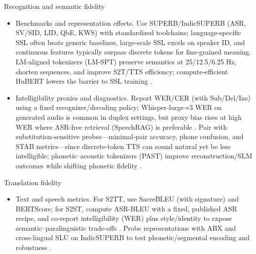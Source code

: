 Recognition and semantic fidelity
\begin{itemize}
  \item Benchmarks and representation effects. Use SUPERB/IndicSUPERB (ASR, SV/SID, LID, QbE, KWS) with standardized toolchains; language-specific SSL often beats generic baselines, large-scale SSL excels on speaker ID, and continuous features typically surpass discrete tokens for fine-grained meaning. LM-aligned tokenizers (LM‑SPT) preserve semantics at 25/12.5/6.25 Hz, shorten sequences, and improve S2T/TTS efficiency; compute-efficient HuBERT lowers the barrier to SSL training \cite{entry2025indicsuperbspeechprocessinguniversalperf,jo2025lmsptalignedsemanticdistillationspeechto,wang2024comparativestudydiscretespeechtokenssema,chen2023reducingbarriersselfsupervisedlearninghu}.
  \item Intelligibility proxies and diagnostics. Report WER/CER (with Sub/Del/Ins) using a fixed recognizer/decoding policy; Whisper‑large‑v3 WER on generated audio is common in duplex settings, but proxy bias rises at high WER where ASR-free retrieval (SpeechRAG) is preferable \cite{ma2024languagemodelcanlistenwhilespeaking,min2025speechretrievalaugmentedgenerationwithou,maimon2025salmonsuiteacousticlanguagemodelevaluati}. Pair with substitution-sensitive probes—minimal-pair accuracy, phone confusion, and STAB metrics—since discrete-token TTS can sound natural yet be less intelligible; phonetic–acoustic tokenizers (PAST) improve reconstruction/SLM outcomes while shifting phonetic fidelity \cite{vashishth2024stabspeechtokenizerassessmentbenchmark,har-tuv2025pastphoneticacousticspeechtokenizer,tseng2025evaluationllmsspeechisoftenflawedtestset,wang2024evaluatingtextspeechsynthesislargediscre}.
\end{itemize}

Translation fidelity
\begin{itemize}
  \item Text and speech metrics. For S2TT, use SacreBLEU (with signature) and BERTScore; for S2ST, compute ASR‑BLEU with a fixed, published ASR recipe, and co-report intelligibility (WER) plus style/identity to expose semantic–paralinguistic trade-offs \cite{peng2024mslms2stmultitaskspeechlanguagemodeltext,jo2025lmsptalignedsemanticdistillationspeechto,chen2023reducingbarriersselfsupervisedlearninghu,entry2025indicsuperbspeechprocessinguniversalperf}. Probe representations with ABX and cross-lingual SLU on IndicSUPERB to test phonetic/segmental encoding and robustness \cite{fily2024establishingdegreesclosenessbetweenaudio,entry2025indicsuperbspeechprocessinguniversalperf}.
\end{itemize}


